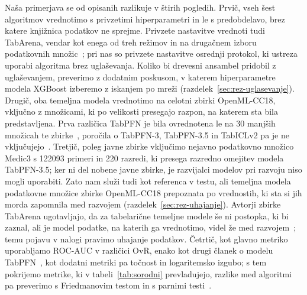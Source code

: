 \documentclass[a4paper,12pt,openright]{book}
\begin{document}
Naša primerjava se od opisanih razlikuje v štirih pogledih. Prvič, vseh šest
algoritmov vrednotimo s privzetimi hiperparametri in le s predobdelavo, brez
katere knjižnica podatkov ne sprejme. Privzete nastavitve vrednoti tudi
TabArena, vendar kot enega od treh režimov in na drugačnem izboru podatkovnih
množic~\cite{erickson2025tabarena}; pri nas so privzete nastavitve osrednji
protokol, ki ustreza uporabi algoritma brez uglaševanja. Koliko bi drevesni
ansambel pridobil z uglaševanjem, preverimo z dodatnim poskusom, v katerem
hiperparametre modela XGBoost izberemo z iskanjem po mreži (razdelek~\ref{sec:rez-uglasevanje}).
Drugič, oba temeljna modela vrednotimo na celotni zbirki OpenML-CC18, vključno z
množicami, ki po velikosti presegajo razpon, na katerem sta bila predstavljena.
Prva različica TabPFN je bila ovrednotena le na 30 manjših množicah te
zbirke~\cite{hollmann2023tabpfn}, poročila o TabPFN-3, TabPFN-3.5 in TabICLv2
pa je ne
vključujejo~\cite{grinsztajn2026tabpfn3,jager2026tabpfn35,qu2026tabiclv2}.
Tretjič, poleg javne zbirke vključimo nejavno podatkovno množico Medic3 s
\num{122093} primeri in 220 razredi, ki presega razredno omejitev modela
TabPFN-3.5; ker ni del nobene javne zbirke, je razvijalci modelov pri razvoju
niso mogli uporabiti. Zato nam služi tudi kot referenca v testu, ali temeljna
modela podatkovne množice zbirke OpenML-CC18 prepoznata po vrednostih, ki sta
si jih morda zapomnila med razvojem (razdelek~\ref{sec:rez-uhajanje}). Avtorji
zbirke TabArena ugotavljajo, da za tabelarične temeljne modele še ni postopka,
ki bi zaznal, ali je model podatke, na katerih ga vrednotimo, videl že med
razvojem~\cite{erickson2025tabarena}; temu pojavu v nalogi pravimo uhajanje
podatkov.
Četrtič, kot glavno metriko uporabljamo ROC-AUC v
različici OvR, enako kot drugi članek o modelu TabPFN~\cite{hollmann2025tabpfn},
kot dodatni metriki pa točnost in logaritemsko izgubo; s tem pokrijemo
metrike, ki v tabeli~\ref{tab:sorodni} prevladujejo, razlike med algoritmi pa
preverimo s Friedmanovim testom in s parnimi
testi~\cite{demsar2006statistical,benavoli2016should}.

\end{document}
